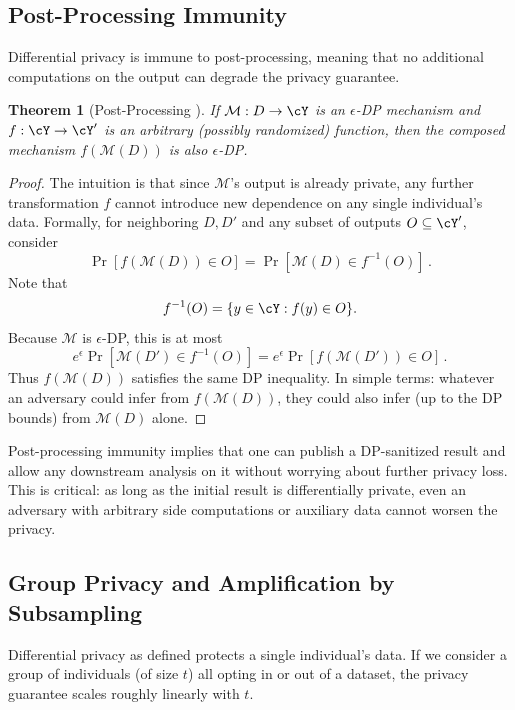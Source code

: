 \documentclass[11pt, a4paper]{article}
\newtheorem{theorem}{Theorem}
\begin{document}
\subsection{Post-Processing Immunity}

Differential privacy is immune to post-processing, meaning that no additional computations on the output can degrade the privacy guarantee.

\begin{theorem}[Post-Processing \cite{DworkRoth2014}]
If $\mathcal{M}: D \to \cY$ is an $\epsilon$-DP mechanism and $f: \cY \to \cY'$ is an arbitrary (possibly randomized) function, 
then the composed mechanism $f(\mathcal{M}(D))$ is also $\epsilon$-DP.
\end{theorem}

\begin{proof}
The intuition is that since $\mathcal{M}$'s output is already private, any further transformation $f$ cannot introduce new dependence on any single individual's data.
Formally, for neighboring $D, D'$ and any subset of outputs $O \subseteq \cY'$, consider 
\[ \Pr[f(\mathcal{M}(D)) \in O] = \Pr[\mathcal{M}(D) \in f^{-1}(O)] \,. \] 
Note that
\begin{align}
    f^{-1}(O) = \{y \in \cY : f(y)\in O\}.
\end{align}
Because $\mathcal{M}$ is $\epsilon$-DP, this is at most 
\[ e^{\epsilon} \Pr[\mathcal{M}(D') \in f^{-1}(O)] = e^{\epsilon} \Pr[f(\mathcal{M}(D')) \in O] \,.\] 
Thus $f(\mathcal{M}(D))$ satisfies the same DP inequality. In simple terms: whatever an adversary could infer from $f(\mathcal{M}(D))$,
they could also infer (up to the DP bounds) from $\mathcal{M}(D)$ alone.
\end{proof}

Post-processing immunity implies that one can publish a DP-sanitized result and allow any downstream analysis on it without worrying about further privacy loss.
This is critical: as long as the initial result is differentially private, even an adversary with arbitrary side computations or auxiliary data cannot worsen the privacy.

\subsection{Group Privacy and Amplification by Subsampling}

Differential privacy as defined protects a single individual's data.
If we consider a group of individuals (of size $t$) all opting in or out of a dataset, the privacy guarantee scales roughly linearly with $t$.
\end{document}
